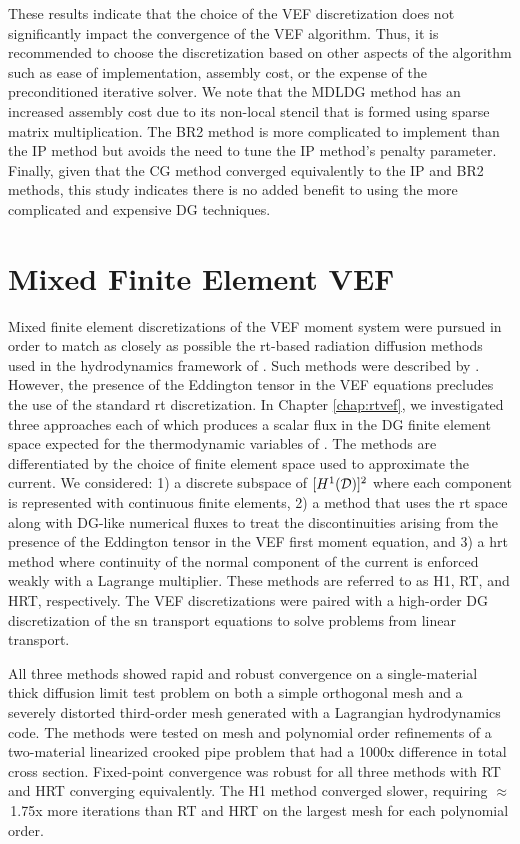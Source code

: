 \documentclass[../doc.tex]{subfiles}
\begin{document}
These results indicate that the choice of the VEF discretization does not significantly impact the convergence of the VEF algorithm. Thus, it is recommended to choose the discretization based on other aspects of the algorithm such as ease of implementation, assembly cost, or the expense of the preconditioned iterative solver. We note that the MDLDG method has an increased assembly cost due to its non-local stencil that is formed using sparse matrix multiplication. The BR2 method is more complicated to implement than the IP method but avoids the need to tune the IP method's penalty parameter. Finally, given that the CG method converged equivalently to the IP and BR2 methods, this study indicates there is no added benefit to using the more complicated and expensive DG techniques. 

\section{Mixed Finite Element VEF}
Mixed finite element discretizations of the VEF moment system were pursued in order to match as closely as possible the \gls{rt}-based radiation diffusion methods used in the hydrodynamics framework of \cite{blast}. Such methods were described by \textcite{pete}. However, the presence of the Eddington tensor in the VEF equations precludes the use of the standard \gls{rt} discretization. In Chapter \ref{chap:rtvef}, we investigated three approaches each of which produces a scalar flux in the DG finite element space expected for the thermodynamic variables of \cite{blast}. 
The methods are differentiated by the choice of finite element space used to approximate the current. We considered: 1) a discrete subspace of $[H^1(\mathcal{D})]^2$ where each component is represented with continuous finite elements, 2) a method that uses the \gls{rt} space along with DG-like numerical fluxes to treat the discontinuities arising from the presence of the Eddington tensor in the VEF first moment equation, and 3) a \gls{hrt} method where continuity of the normal component of the current is enforced weakly with a Lagrange multiplier. These methods are referred to as H1, RT, and HRT, respectively. The VEF discretizations were paired with a high-order DG discretization of the \gls{sn} transport equations to solve problems from linear transport. 

All three methods showed rapid and robust convergence on a single-material thick diffusion limit test problem on both a simple orthogonal mesh and a severely distorted third-order mesh generated with a Lagrangian hydrodynamics code. The methods were tested on mesh and polynomial order refinements of a two-material linearized crooked pipe problem that had a 1000x difference in total cross section. Fixed-point convergence was robust for all three methods with RT and HRT converging equivalently. The H1 method converged slower, requiring $\approx$\!\,1.75x more iterations than RT and HRT on the largest mesh for each polynomial order. 
\end{document}
